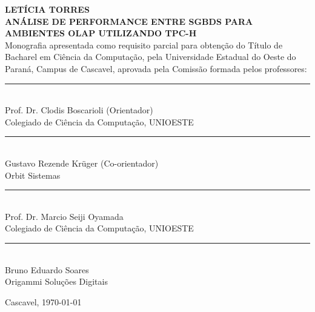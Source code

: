 

\begin{center}
\fontsize{12}{12}
\textbf{LETÍCIA TORRES}\\
\vspace{3cm}
\fontsize{14}{14}
\textbf{\MakeUppercase{Análise de Performance entre SGBDs para Ambientes OLAP Utilizando TPC-H}}\\
\vspace{3cm}
\fontsize{10}{10}
Monografia apresentada como requisito parcial para obtenção do Título de Bacharel em Ciência da Computação, pela Universidade Estadual do Oeste do Paraná, Campus de Cascavel, aprovada pela Comissão formada pelos professores:\\
\vspace{1.5cm}
\begin{flushright}
\begin{minipage}[10cm] {8.5cm}
\begin{center}
\rule{6cm}{0.01mm}\\
Prof. Dr. Clodis Boscarioli (Orientador)\\
Colegiado de Ciência da Computação, UNIOESTE\\
\vspace{1cm}
\rule{6cm}{0.01mm}\\
Gustavo Rezende Krüger (Co-orientador)\\
Orbit Sistemas\\
\vspace{1cm}
\rule{6cm}{0.01mm}\\
Prof. Dr. Marcio Seiji Oyamada\\
Colegiado de Ciência da Computação, UNIOESTE\\
\vspace{1cm}
\rule{6cm}{0.01mm}\\
Bruno Eduardo Soares\\
Origammi Soluções Digitais\\
\end{center}
\end{minipage}
\end{flushright}
\vspace{2cm}
Cascavel, \today
\end{center} 